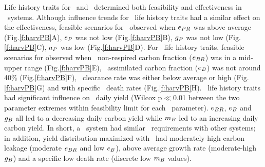 \documentclass[../thesis.tex]{subfiles} %
\begin{document}
Life history traits for \phy\ and \bac\ determined both feasibility and effectiveness in \PBH\ systems.  Although influence trends for \phy\ life history traits had a similar effect on the effectiveness, feasible scenarios for \PBH\ observed when $e_{PR}$ was above average (Fig.\ref{f:harvPB}A), $e_P$ was not low (Fig.\ref{f:harvPB}B), $g_P$ was not low (Fig.\ref{f:harvPB}C), $a_P$ was low (Fig.\ref{f:harvPB}D).  For \bac\ life history traits, feasible scenarios for \PBH observed when \bac\ non-respired carbon fraction ($e_{BR}$) was in a mid-upper range (Fig.\ref{f:harvPB}E), \bac\ assimilated carbon fraction ($e_B$) was not around 40\% (Fig.\ref{f:harvPB}F), \bac\ clearance rate was either below average or high (Fig.\ref{f:harvPB}G) and with specific \bac\ death rates (Fig.\ref{f:harvPB}H).  \Bac\ life history traits had significant influence on \PBH\ daily yield (Wilcox p$\ll$0.01 between the two parameter extremes within feasibility limit for each \bac\ parameter).  $e_{BR}$, $e_B$ and $g_B$ all led to a decreasing daily carbon yield while $m_B$ led to an increasing daily carbon yield.  In short, a \PBH\ system had similar \phy\ requirements with other systems; in addition, yield distribution maximized with \bac\ had moderately-high carbon leakage (moderate $e_{BR}$ and low $e_B$), above average growth rate (moderate-high $g_B$) and a specific low death rate (discrete low $m_B$ values).
\end{document}
